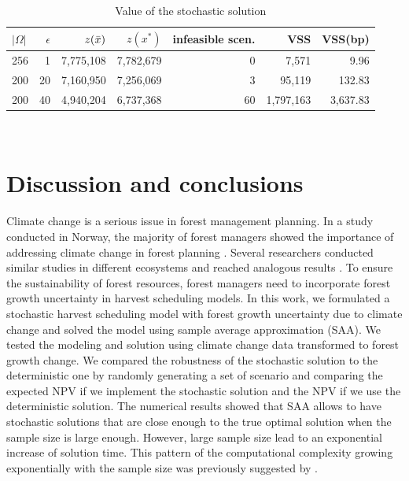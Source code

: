 \documentclass[forests,article,submit,moreauthors,pdftex]{Definitions/mdpi}
\begin{document}
\begin{table}[hbt!]
\caption{Value of the stochastic solution}
\label{tab:cost_stochastic}
\centering\begin{tabular}{lrrrrrr}
\toprule
$|\Omega|$ & $\epsilon$ & $z(\Bar{x})$ & $z(x^*)$   &  infeasible scen. & VSS      & VSS(bp) \\
\midrule
256                 & 1       & 7,775,108    &  7,782,679  & 0  & 7,571 & 9.96    \\
200                  & 20      & 7,160,950      & 7,256,069 & 3   & 95,119 & 132.83   \\
200                  & 40      &  4,940,204 &	6,737,368	& 60 & 1,797,163    &  3,637.83    \\
\bottomrule      
\end{tabular}\\
\end{table}



\section{Discussion and conclusions} \label{sec:conclusion}

Climate change is a serious issue in forest management planning. In a study conducted in Norway, the majority of forest managers showed the importance of addressing climate change in forest planning \citep{Heltorp2018}. Several researchers conducted similar studies in different ecosystems and reached analogous results \citep{Scheller2018, Liu2020}. To ensure the sustainability of forest resources, forest managers need to incorporate forest growth uncertainty in harvest scheduling models. In this work, we formulated a stochastic harvest scheduling model with forest growth uncertainty due to climate change and solved the model using sample average approximation (SAA). We tested the modeling and solution using climate change data transformed to forest growth change. We compared the robustness of the stochastic solution to the deterministic one by randomly generating  a set of scenario and comparing the expected NPV if we implement the stochastic solution and the NPV if we use the deterministic solution. 
The numerical results showed that SAA allows to have stochastic solutions that are close enough to the true optimal solution when the sample size is large enough. However, large sample size lead to an exponential increase of solution time. This pattern of the computational complexity growing exponentially with the sample size was previously suggested by \cite{Kleywegt2001}. 
\end{document}
